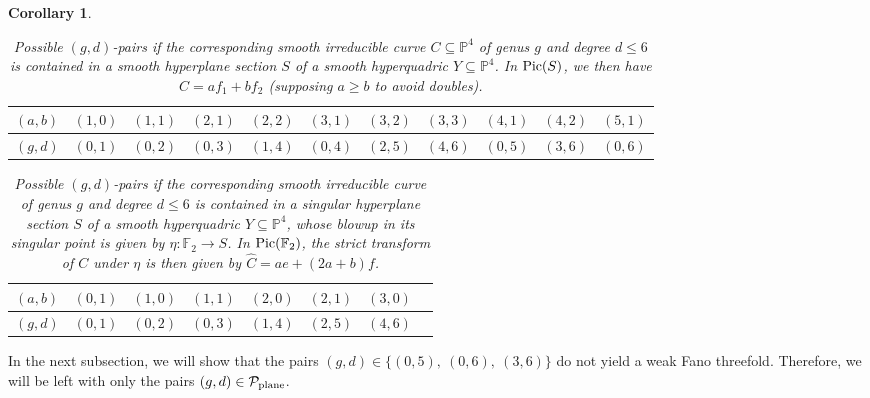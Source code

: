 \documentclass[english,11pt,reqno]{amsart}
\newcommand{\sub}{\subseteq}
\newcommand{\Pfour}{\mathbb{P}^4}
\newcommand{\Pic}{\textup{Pic}}
\newcommand{\Ftwo}{\mathbb{F}_2}
\newtheorem{cor}[thm]{Corollary}
\begin{document}
\begin{cor}
\begin{enumcor}
\end{enumcor}
%
\begin{table}[H] 
\caption{Possible $(g,d)$-pairs if the corresponding smooth irreducible curve $C\sub \Pfour$ of genus $g$ and degree $d\leq 6$ is contained in a smooth hyperplane section $S$ of a smooth hyperquadric $Y\sub \Pfour $. In $\Pic(S)$, we then have $C=af_1+bf_2$ (supposing $a\geq b$ to avoid doubles).}
\begin{minipage}{\textwidth}
\centering
\vspace{6pt}
\begin{tabular}{|l|l|l|l|l|l|l|l|l|l|l|} 
	\hline
	$(a,b)$ & $(1,0)$ & $(1,1)$ & $(2,1)$ & $(2,2)$ & $(3,1)$ & $(3,2)$ & $(3,3)$ & $(4,1)$ & $(4,2)$ & $(5,1)$ \\
	\hline
	$(g,d)$ & $(0,1)$ & $(0,2)$ & $(0,3)$ & $(1,4)$ & $(0,4)$ & $(2,5)$ & $(4,6)$ & $(0,5)$ & $(3,6)$ & $(0,6)$ \\
	\hline
\end{tabular}
\vspace{6pt}
\end{minipage}\label{table:a_b_pairs_curves_in_P1xP1}
\end{table}
%
\vspace{-0.5cm}
\begin{table}[H] 
\caption{Possible $(g,d)$-pairs if the corresponding smooth irreducible curve of genus $g$ and degree $d\leq 6$ is contained in a singular hyperplane section $S$ of a smooth hyperquadric $Y\sub \Pfour $, whose blowup in its singular point is given by $\eta:\Ftwo\rightarrow S$. In $\Pic(\Ftwo)$, the strict transform of $C$ under $\eta$ is then given by $\hat{C}=ae+(2a+b)f$.}
\begin{minipage}{\textwidth}
\centering
\vspace{6pt}
\begin{tabular}{|l|l|l|l|l|l|l|l|}
	\hline
	$(a,b)$ & $(0,1)$ & $(1,0)$ & $(1,1)$ & $(2,0)$ & $(2,1)$ & $(3,0)$ \\
	\hline
	$(g,d)$ & $(0,1)$ & $(0,2)$ & $(0,3)$ & $(1,4)$ & $(2,5)$ & $(4,6)$ \\
	\hline
\end{tabular}
\vspace{6pt}
\end{minipage}
\label{table:a_b_pairs_curves_in_quadric_cone}
\end{table}
\end{cor}
%
%
%
In the next subsection, we will show that the pairs $(g,d)\in \{(0,5), \:(0,6),\:(3,6)\}$ do not yield a weak Fano threefold. Therefore, we will be left with only the pairs $(g,d)\in \mathcal{P}_{\textup{plane}}$. \par 
\end{document}
